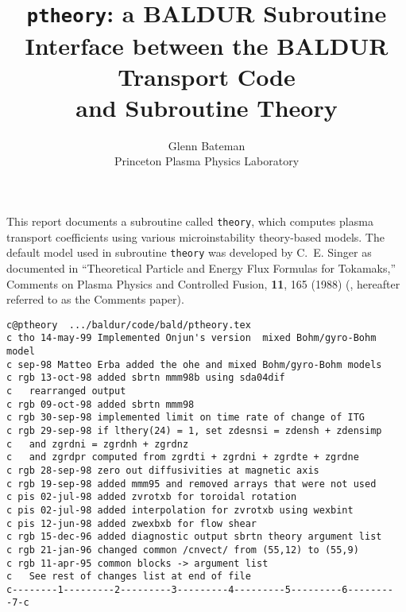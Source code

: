 %
%
\headheight 0pt \headsep 0pt  \topmargin 0pt  \oddsidemargin 0pt
\textheight 9.0in \textwidth 6.5in

\title{ {\tt ptheory}: a BALDUR Subroutine \\ 
 Interface between the BALDUR Transport Code \\
 and Subroutine Theory}     %
\author{
        Glenn Bateman \\ Princeton Plasma Physics Laboratory}
\maketitle                 %

This report documents a subroutine called {\tt theory}, which computes plasma 
transport coefficients using various microinstability theory-based models.
The default model used in subroutine {\tt theory} was developed by
C.~E. Singer as documented in
``Theoretical Particle and Energy Flux Formulas for Tokamaks,''
Comments on Plasma Physics and Controlled Fusion, {\bf 11}, 165 (1988)
(\cite{Comments}, hereafter referred to as the Comments paper).

\begin{verbatim}
c@ptheory  .../baldur/code/bald/ptheory.tex
c tho 14-may-99 Implemented Onjun's version  mixed Bohm/gyro-Bohm model
c sep-98 Matteo Erba added the ohe and mixed Bohm/gyro-Bohm models
c rgb 13-oct-98 added sbrtn mmm98b using sda04dif
c   rearranged output
c rgb 09-oct-98 added sbrtn mmm98
c rgb 30-sep-98 implemented limit on time rate of change of ITG
c rgb 29-sep-98 if lthery(24) = 1, set zdesnsi = zdensh + zdensimp
c   and zgrdni = zgrdnh + zgrdnz
c   and zgrdpr computed from zgrdti + zgrdni + zgrdte + zgrdne
c rgb 28-sep-98 zero out diffusivities at magnetic axis
c rgb 19-sep-98 added mmm95 and removed arrays that were not used
c pis 02-jul-98 added zvrotxb for toroidal rotation
c pis 02-jul-98 added interpolation for zvrotxb using wexbint
c pis 12-jun-98 added zwexbxb for flow shear
c rgb 15-dec-96 added diagnostic output sbrtn theory argument list
c rgb 21-jan-96 changed common /cnvect/ from (55,12) to (55,9)
c rgb 11-apr-95 common blocks -> argument list
c   See rest of changes list at end of file
c--------1---------2---------3---------4---------5---------6---------7-c
\end{verbatim}

